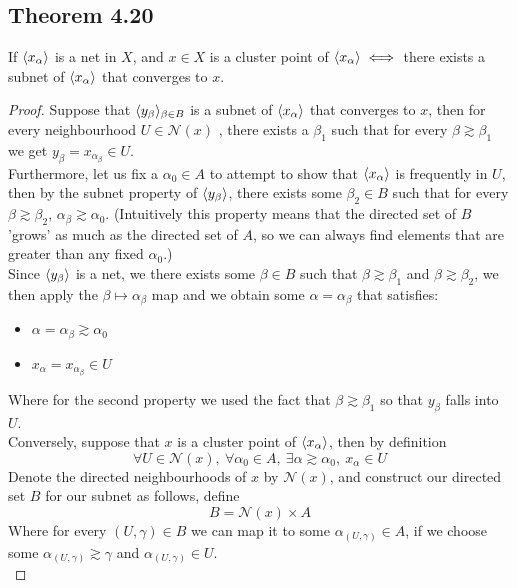 \documentclass[../../main.tex]{subfiles}
\begin{document}
\subsection{Theorem 4.20}
\newcommand{\xa}{\abrackets{x_\alpha}} %
\newcommand{\n}[1]{\mathcal{N}({#1})} %
\begin{wts}
If $\xa$ is a net in $X$, and $x\in X$ is a cluster point of $\xa\iff$ there exists a subnet of $\xa$ that converges to $x$.
\end{wts}
\begin{proof}
Suppose that $\langle {y_\beta} \rangle_{\beta\in B}$ is a subnet of $\xa$ that converges to $x$, then for every neighbourhood $U\in\n{x}$ , there exists a $\beta_1$ such that for every $\beta\gtrsim\beta_1$ we get $y_\beta = x_{\alpha_\beta}\in U$.\\

Furthermore, let us fix a $\alpha_0\in A$ to attempt to show that $\xa$ is frequently in $U$, then by the subnet property of $\langle {y_\beta} \rangle$, there exists some $\beta_2\in B$ such that for every $\beta\gtrsim\beta_2$, $\alpha_\beta\gtrsim \alpha_0$. (Intuitively this property means that the directed set of $B$ 'grows' as much as the directed set of $A$, so we can always find elements that are greater than any fixed $\alpha_0$.)\\

Since $\langle {y_\beta} \rangle$ is a net, we there exists some $\beta\in B$ such that $\beta\gtrsim\beta_1$ and $\beta\gtrsim\beta_2$, we then apply the $\beta\mapsto \alpha_\beta$ map and we obtain some $\alpha=\alpha_\beta$ that satisfies:
\begin{itemize}
    \item $\alpha=\alpha_\beta\gtrsim\alpha_0$
    \item $x_\alpha = x_{\alpha_\beta}\in U$
\end{itemize}
Where for the second property we used the fact that $\beta\gtrsim\beta_1$ so that $y_\beta$ falls into $U$.\\

Conversely, suppose that $x$ is a cluster point of $\xa$, then by definition
\[
\forall U\in\n{x},\:\forall\alpha_0\in A,\:\exists\alpha\gtrsim\alpha_0,\:x_\alpha\in U
\]
Denote the directed neighbourhoods of $x$ by $\n{x}$, and construct our directed set $B$ for our subnet as follows, define
\[
B = \n{x}\times A
\]
Where for every $(U,\gamma)\in B$ we can map it to some $\alpha_{(U,\gamma)}\in A$, if we choose some $\alpha_{(U,\gamma)}\gtrsim\gamma$ and $\alpha_{(U,\gamma)}\in U$. \\


\end{proof}
\end{document}
